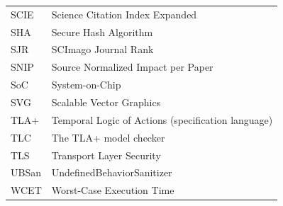 \begin{longtable}{@{}p{}p{}@{}}
SCIE     & Science Citation Index Expanded \\
SHA      & Secure Hash Algorithm \\
SJR      & SCImago Journal Rank \\
SNIP     & Source Normalized Impact per Paper \\
SoC      & System-on-Chip \\
SVG      & Scalable Vector Graphics \\
TLA+     & Temporal Logic of Actions (specification language) \\
TLC      & The TLA+ model checker \\
TLS      & Transport Layer Security \\
UBSan    & UndefinedBehaviorSanitizer \\
WCET     & Worst-Case Execution Time \\
\bottomrule
\end{longtable}
